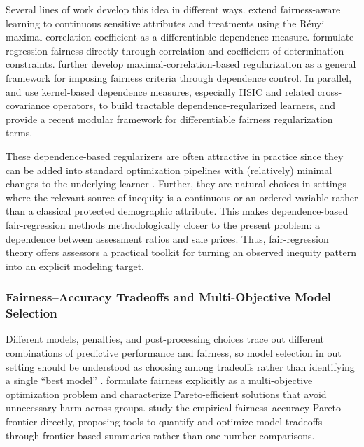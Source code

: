 \documentclass[12pt, draft]{article}
\theoremstyle{plain}
\theoremstyle{definition}
\newcommand{\1}{\mathbf{1}}
\begin{document}
Several lines of work develop this idea in different ways. \textcite{MaryEtAl2019} extend fairness-aware learning to continuous sensitive attributes and treatments using the R\'enyi maximal correlation coefficient as a differentiable dependence measure. \textcite{KomiyamaEtAl2018} formulate regression fairness directly through correlation and coefficient-of-determination constraints. \textcite{lee2022maximal} further develop maximal-correlation-based regularization as a general framework for imposing fairness criteria through dependence control. In parallel, \textcite{PerezSuayEtAl2017} and \textcite{LiEtAl2022Fairness} use kernel-based dependence measures, especially HSIC and related cross-covariance operators, to build tractable dependence-regularized learners, and \textcite{BuylDefranceDeBie2024FAIRRET} provide a recent modular framework for differentiable fairness regularization terms.

These dependence-based regularizers are often attractive in practice since they can be added into standard optimization pipelines with (relatively) minimal changes to the underlying learner \cite{KomiyamaEtAl2018,MaryEtAl2019,LiEtAl2022Fairness,lee2022maximal,BuylDefranceDeBie2024FAIRRET}. Further, they are natural choices in settings where the relevant source of inequity is a continuous or an ordered variable rather than a classical protected demographic attribute. This makes dependence-based fair-regression methods methodologically closer to the present problem: a dependence between assessment ratios and sale prices. Thus, fair-regression theory offers assessors a practical toolkit for turning an observed inequity pattern into an explicit modeling target.

\subsubsection{Fairness--Accuracy Tradeoffs and Multi-Objective Model Selection}





Different models, penalties, and post-processing choices trace out different combinations of predictive performance and fairness, so model selection in out setting should be understood as choosing among tradeoffs rather than identifying a single ``best model'' \cite{CatonHaas2024}. \textcite{martinez2020minimax} formulate fairness explicitly as a multi-objective optimization problem and characterize Pareto-efficient solutions that avoid unnecessary harm across groups. \textcite{little2022fairness} study the empirical fairness--accuracy Pareto frontier directly, proposing tools to quantify and optimize model tradeoffs through frontier-based summaries rather than one-number comparisons.
\end{document}
